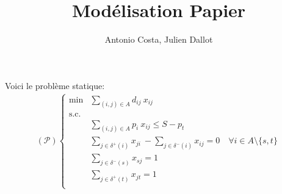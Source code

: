 \documentclass[11pt,a4paper]{exam}
\title{Modélisation Papier}
\author{Antonio Costa, Julien Dallot}
\begin{document}
\maketitle

\begin{questions}
	\question Voici le problème statique:
	\begin{align*}
		\left(\mathcal{P}\right) \left\{
		\begin{array}{ll}
			\min &\sum\limits_{(i, j) \in A} d_{ij} \: x_{ij}\\
			\text{s.c.}\\
			&\sum\limits_{(i, j) \in A} p_{i} \: x_{ij} \leq S - p_{t}\\
			&\sum\limits_{j \in \delta^{+}(i)} x_{ji} \ - \sum\limits_{j \in \delta^{-}(i)} x_{ij} = 0 \quad \forall i \in A \setminus \{s, t\}\\
			&\sum\limits_{j \in \delta^{-}(s)} x_{sj} = 1\\
			&\sum\limits_{j \in \delta^{+}(t)} x_{jt} = 1\\
		\end{array}
		\right.
	\end{align*}
\end{questions}
\end{document}
